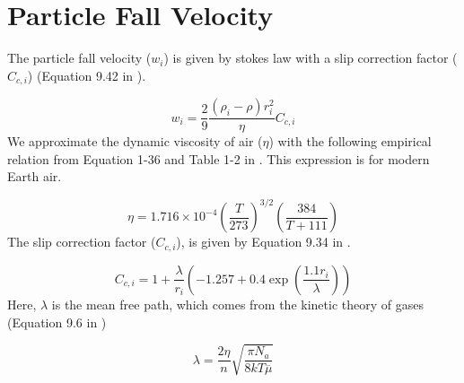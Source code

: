 \section{Particle Fall Velocity} \label{sec:fall_velocity}

The particle fall velocity ($w_i$) is given by stokes law with a slip correction factor ($C_{c,i}$) (Equation 9.42 in \citet{Seinfeld_2006}).

\begin{equation} \label{eq:stokes_law}
  w_i = \frac{2}{9} \frac{(\rho_i - \rho)r_i^2}{\eta} C_{c,i}
\end{equation}
We approximate the dynamic viscosity of air ($\eta$) with the following empirical relation from Equation 1-36 and Table 1-2 in \citet{White_2006}. This expression is for modern Earth air.

\begin{equation} \label{eq:dynamic_viscosity}
  \eta = 1.716 \times 10^{-4} \left(\frac{T}{273}\right)^{3/2} \left( \frac{384}{T + 111} \right)
\end{equation}
The slip correction factor ($C_{c,i}$), is given by Equation 9.34 in \citet{Seinfeld_2006}.

\begin{equation} \label{eq:slip_correction}
  C_{c,i} = 1 + \frac{\lambda}{r_i}\left( -1.257 + 0.4 \exp \left(\frac{1.1 r_i}{\lambda}\right) \right)
\end{equation}
Here, $\lambda$ is the mean free path, which comes from the kinetic theory of gases (Equation 9.6 in \citet{Seinfeld_2006})

\begin{equation}
  \lambda = \frac{2 \eta}{n} \sqrt{\frac{\pi N_a}{8 k T \overline{\mu}}}
\end{equation}

